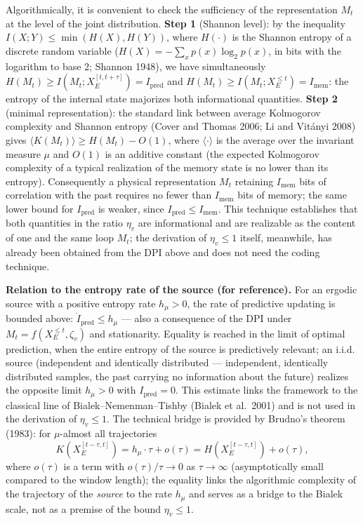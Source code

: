 \documentclass[pdflatex,sn-mathphys-ay]{sn-jnl}
\begin{document}
Algorithmically, it is convenient to check the sufficiency of the representation \(M_t\) at the level of the joint distribution. \textbf{Step 1} (Shannon level): by the inequality \(I(X; Y) \le \min(H(X), H(Y))\), where \(H(\cdot)\) is the Shannon entropy of a discrete random variable (\(H(X) = -\sum_x p(x) \log_2 p(x)\), in bits with the logarithm to base 2; Shannon 1948), we have simultaneously \(H(M_t) \ge I(M_t; X_E^{[t, t+\tau]}) = I_{\text{pred}}\) and \(H(M_t) \ge I(M_t; X_E^{\le t}) = I_{\text{mem}}\): the entropy of the internal state majorizes both informational quantities. \textbf{Step 2} (minimal representation): the standard link between average Kolmogorov complexity and Shannon entropy (Cover and Thomas 2006; Li and Vitányi 2008) gives \(\langle K(M_t)\rangle \ge H(M_t) - O(1)\), where \(\langle\cdot\rangle\) is the average over the invariant measure \(\mu\) and \(O(1)\) is an additive constant (the expected Kolmogorov complexity of a typical realization of the memory state is no lower than its entropy). Consequently a physical representation \(M_t\) retaining \(I_{\text{mem}}\) bits of correlation with the past requires no fewer than \(I_{\text{mem}}\) bits of memory; the same lower bound for \(I_{\text{pred}}\) is weaker, since \(I_{\text{pred}} \le I_{\text{mem}}\). This technique establishes that both quantities in the ratio \(\eta_v\) are informational and are realizable as the content of one and the same loop \(M_t\); the derivation of \(\eta_v \le 1\) itself, meanwhile, has already been obtained from the DPI above and does not need the coding technique.

\textbf{Relation to the entropy rate of the source (for reference).} For an ergodic source with a positive entropy rate \(h_\mu > 0\), the rate of predictive updating is bounded above: \(\dot I_{\text{pred}} \le h_\mu\) --- also a consequence of the DPI under \(M_t = f(X_E^{\le t}, \zeta_v)\) and stationarity. Equality is reached in the limit of optimal prediction, when the entire entropy of the source is predictively relevant; an i.i.d. source (independent and identically distributed --- independent, identically distributed samples, the past carrying no information about the future) realizes the opposite limit \(h_\mu > 0\) with \(I_{\text{pred}} = 0\). This estimate links the framework to the classical line of Bialek--Nemenman--Tishby (Bialek et al.~2001) and is not used in the derivation of \(\eta_v \le 1\). The technical bridge is provided by Brudno's theorem (1983): for \(\mu\)-almost all trajectories \[K(X_E^{[t-\tau, t]}) = h_\mu \cdot \tau + o(\tau) = H(X_E^{[t-\tau, t]}) + o(\tau),\] where \(o(\tau)\) is a term with \(o(\tau)/\tau \to 0\) as \(\tau \to \infty\) (asymptotically small compared to the window length); the equality links the algorithmic complexity of the trajectory of the \emph{source} to the rate \(h_\mu\) and serves as a bridge to the Bialek scale, not as a premise of the bound \(\eta_v \le 1\).
\end{document}
